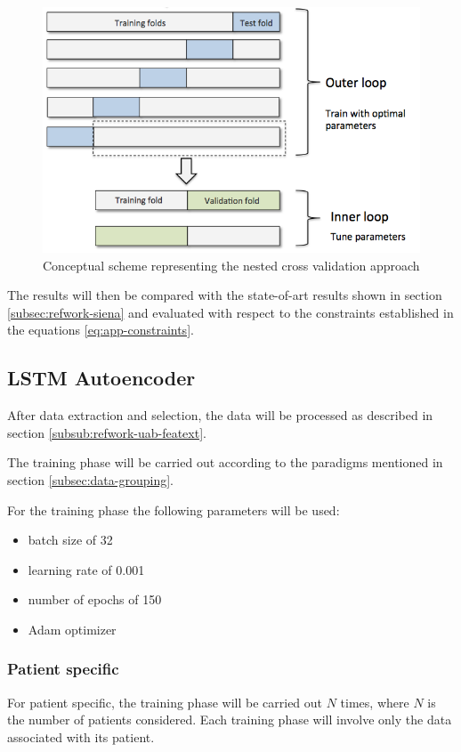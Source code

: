 \begin{figure}[ht]
    \centering
    \includegraphics[width=1.0\textwidth]{images/Experimental-validation/nested-crossval.png}
    \caption{Conceptual scheme representing the nested cross validation approach \cite{jacopo_repossi_tutorial_2022}}
    \label{fig:nested-crossval}
\end{figure}

The results will then be compared with the state-of-art results shown in section \ref{subsec:refwork-siena} and evaluated with respect to the constraints established in the equations \ref{eq:app-constraints}.

\subsection{LSTM Autoencoder} \label{subsec:lstm-exp}
After data extraction and selection, the data will be processed as described in section \ref{subsub:refwork-uab-featext}.

The training phase will be carried out according to the paradigms mentioned in section \ref{subsec:data-grouping}.

For the training phase the following parameters will be used:
\begin{itemize}
    \item batch size of 32
    \item learning rate of 0.001
    \item number of epochs of 150
    \item Adam optimizer 
\end{itemize}

\subsubsection{Patient specific} \label{subsub:patient-specific-exp}
For patient specific, the training phase will be carried out $N$ times, where $N$ is the number of patients considered. Each training phase will involve only the data associated with its patient.


